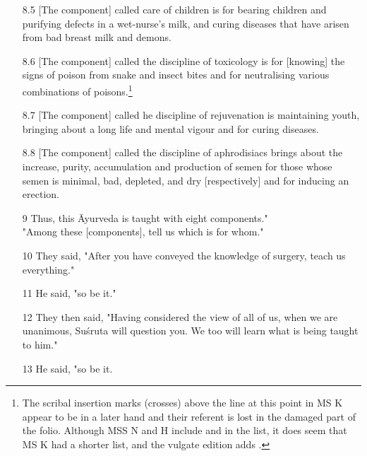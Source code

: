 \documentclass[12pt]{article}
\begin{document}
\begin{itemize}
        
        \item[8.5] [The component] called care of children is for bearing children and purifying defects in a wet-nurse's milk, and curing diseases that have arisen from bad breast milk and demons.
        
        \item[8.6] [The component] called the discipline of toxicology is for
[knowing] the signs of poison from snake and insect bites and for
neutralising various combinations of poisons.\footnote{The scribal
insertion marks (crosses) above the line at this point in MS K appear to
be in a later hand and their referent is lost in the damaged part of the
folio.  Although MSS N and H include  and
 in the list, it does seem that MS K had
a shorter list, and the vulgate edition adds .}
        
        \item[8.7] [The component] called he discipline of rejuvenation is maintaining youth, bringing about a long life and mental vigour and for curing diseases.
        
        
        \item[8.8] [The component] called the discipline of aphrodisiacs brings about the increase, purity, accumulation and  production of semen for those whose semen is minimal, bad, depleted, and dry [respectively] and for inducing an erection.
        
        \item[9] Thus, this Āyurveda is taught with eight components."\\ 
        
        "Among these [components], tell us which is for whom."
        
        \item[10] They said, "After you have conveyed the knowledge of surgery, teach us everything."
        
        \item[11] He said, "so be it."
        
        \item[12] They then said, "Having considered the view of all of us, when we are unanimous, Suśruta will question you. We too will learn what is being taught to him."
        
        \item[13] He said, "so be it.
        

\end{itemize}
\end{document}
